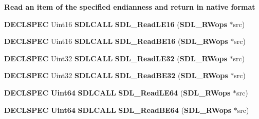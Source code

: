 \begin{Indent}{\bf Read an item of the specified endianness and return in native format}\par
\begin{DoxyCompactItemize}
\item 
{\bf D\+E\+C\+L\+S\+P\+E\+C} Uint16 {\bf S\+D\+L\+C\+A\+L\+L} {\bfseries S\+D\+L\+\_\+\+Read\+L\+E16} ({\bf S\+D\+L\+\_\+\+R\+Wops} $\ast$src)\label{_s_d_l__rwops_8h_a7274f5c4b6f22a6b742ec6ef4f9d390b}

\item 
{\bf D\+E\+C\+L\+S\+P\+E\+C} Uint16 {\bf S\+D\+L\+C\+A\+L\+L} {\bfseries S\+D\+L\+\_\+\+Read\+B\+E16} ({\bf S\+D\+L\+\_\+\+R\+Wops} $\ast$src)\label{_s_d_l__rwops_8h_a3cdf85a50e40dc58536930429b7b4d09}

\item 
{\bf D\+E\+C\+L\+S\+P\+E\+C} Uint32 {\bf S\+D\+L\+C\+A\+L\+L} {\bfseries S\+D\+L\+\_\+\+Read\+L\+E32} ({\bf S\+D\+L\+\_\+\+R\+Wops} $\ast$src)\label{_s_d_l__rwops_8h_a8320334c299a3631fd6beb9937c30f04}

\item 
{\bf D\+E\+C\+L\+S\+P\+E\+C} Uint32 {\bf S\+D\+L\+C\+A\+L\+L} {\bfseries S\+D\+L\+\_\+\+Read\+B\+E32} ({\bf S\+D\+L\+\_\+\+R\+Wops} $\ast$src)\label{_s_d_l__rwops_8h_af023e134e3ae87b1595306e5faeaab76}

\item 
{\bf D\+E\+C\+L\+S\+P\+E\+C} {\bf Uint64} {\bf S\+D\+L\+C\+A\+L\+L} {\bfseries S\+D\+L\+\_\+\+Read\+L\+E64} ({\bf S\+D\+L\+\_\+\+R\+Wops} $\ast$src)\label{_s_d_l__rwops_8h_af7e5d9b56874b8bd3a8a6a0c5393c33d}

\item 
{\bf D\+E\+C\+L\+S\+P\+E\+C} {\bf Uint64} {\bf S\+D\+L\+C\+A\+L\+L} {\bfseries S\+D\+L\+\_\+\+Read\+B\+E64} ({\bf S\+D\+L\+\_\+\+R\+Wops} $\ast$src)\label{_s_d_l__rwops_8h_a4917dc584d162bc5f28b63843557214e}

\end{DoxyCompactItemize}
\end{Indent}
